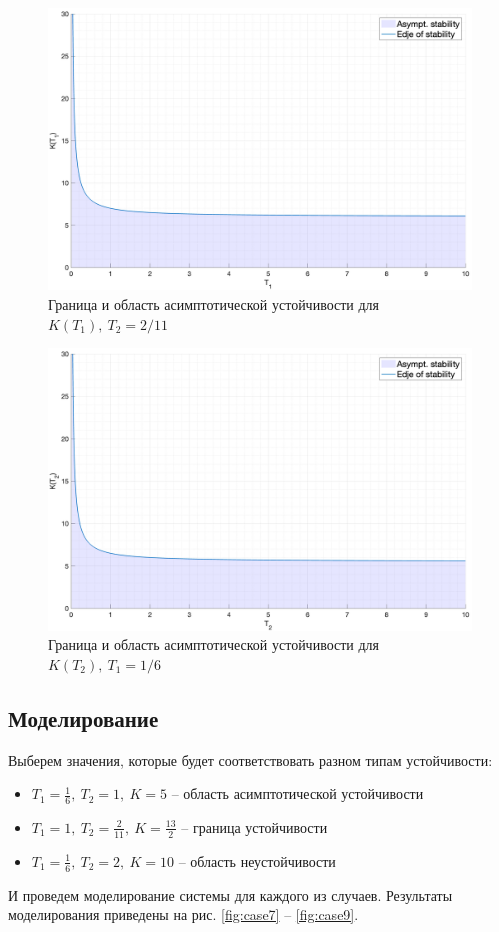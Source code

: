 \begin{figure}
    \centering
    \includegraphics[width=\textwidth]{media/T1.png}
    \caption{Граница и область асимптотической устойчивости для $K(T_1),~T_2 = 2/11$}
    \label{fig:T1K}
\end{figure}

\begin{figure}
    \centering
    \includegraphics[width=\textwidth]{media/T2.png}
    \caption{Граница и область асимптотической устойчивости для $K(T_2),~T_1 = 1/6$}
    \label{fig:T2K}
\end{figure}

\FloatBarrier
\subsection{Моделирование}
Выберем значения, которые будет соответствовать разном типам устойчивости:
\begin{itemize}
    \item $T_1 = \frac{1}{6},~T_2 = 1,~K = 5$ -- область асимптотической устойчивости
    \item $T_1 = 1,~T_2 = \frac{2}{11},~K = \frac{13}{2}$ -- граница устойчивости
    \item $T_1 = \frac{1}{6},~T_2 = 2,~K = 10$ -- область неустойчивости
\end{itemize}
И проведем моделирование системы для каждого из случаев. Результаты моделирования приведены на рис. \ref{fig:case7} -- \ref{fig:case9}.

